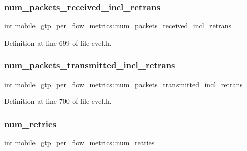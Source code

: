 \subsubsection{\texorpdfstring{num\+\_\+packets\+\_\+received\+\_\+incl\+\_\+retrans}{num\_packets\_received\_incl\_retrans}}
{\footnotesize\ttfamily int mobile\+\_\+gtp\+\_\+per\+\_\+flow\+\_\+metrics\+::num\+\_\+packets\+\_\+received\+\_\+incl\+\_\+retrans}



Definition at line 699 of file evel.\+h.

\hypertarget{structmobile__gtp__per__flow__metrics_ac4db5d2e2c72d0e6844b1049d6b583dd}{}\label{structmobile__gtp__per__flow__metrics_ac4db5d2e2c72d0e6844b1049d6b583dd} 
\subsubsection{\texorpdfstring{num\+\_\+packets\+\_\+transmitted\+\_\+incl\+\_\+retrans}{num\_packets\_transmitted\_incl\_retrans}}
{\footnotesize\ttfamily int mobile\+\_\+gtp\+\_\+per\+\_\+flow\+\_\+metrics\+::num\+\_\+packets\+\_\+transmitted\+\_\+incl\+\_\+retrans}



Definition at line 700 of file evel.\+h.

\hypertarget{structmobile__gtp__per__flow__metrics_aa23128f878c58eb3ba1fd600b17e1035}{}\label{structmobile__gtp__per__flow__metrics_aa23128f878c58eb3ba1fd600b17e1035} 
\subsubsection{\texorpdfstring{num\+\_\+retries}{num\_retries}}
{\footnotesize\ttfamily int mobile\+\_\+gtp\+\_\+per\+\_\+flow\+\_\+metrics\+::num\+\_\+retries}




